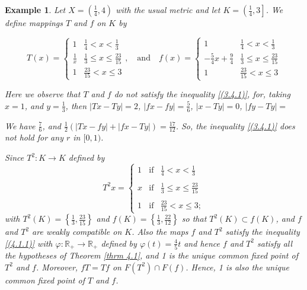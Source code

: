 \documentclass[a4paper,12pt,oneside]{article}
\newtheorem{example}[theorem]{Example}
\numberwithin{equation}{section}
\begin{document}
\begin{example}
    Let \(X = \left(\frac{1}{4}, 4\right)\) with the usual metric and let \(K = \left(\frac{1}{4}, 3\right]\). We define mappings \(T\) and \(f\) on \(K\) by

     \[
    T(x) = \begin{cases} 
        1 & \frac{1}{4} < x < \frac{1}{3} \\
        \frac{1}{x} & \frac{1}{3} \leq x \leq \frac{23}{15} \\
        1 & \frac{23}{15} < x \leq 3 
    \end{cases}, \quad \text{and} \quad
    f(x) = \begin{cases} 
        1 & \frac{1}{4} < x < \frac{1}{3} \\
        -\frac{5}{4}x + \frac{9}{4} & \frac{1}{3} \leq x \leq \frac{23}{15} \\
        1 & \frac{23}{15} < x \leq 3 
    \end{cases}
    \]

Here we observe that \(T\) and \(f\) do not satisfy the inequality \eqref{(3.4.1)}, for, taking \(x = 1\), and \(y = \frac{1}{3}\), then \(|Tx - Ty| = 2\), \(|fx - fy| = \frac{5}{6}\), \(|x - Ty| = 0\), \(|fy - Ty| = \)

We have $\frac{7}{6}$, and $\frac{1}{2}\left(|Tx-fy| + |fx-Ty|\right) = \frac{17}{12}$. So, the inequality \eqref{(3.4.1)} does not hold for any $r$ in $[0,1)$.

Since $T^2:K\to K$ defined by
\[
T^2x = \left\{
\begin{array}{ccc}
1 & \text{if} & \frac{1}{4}<x<\frac{1}{3} \\ 
\\ 
x & \text{if} & \frac{1}{3}\leq x\leq\frac{23}{15} \\ 
\\ 
1 & \text{if} & \frac{23}{15}<x\leq 3;
\end{array}
\right.
\]
with $T^2(K)=\left\{\frac{1}{3},\frac{23}{15}\right\}$ and $f(K)=\left\{\frac{1}{3},\frac{22}{12}\right\}$ so that $T^2(K)\subset f(K)$, and $f$ and $T^2$ are weakly compatible on $K$. Also the maps $f$ and $T^2$ satisfy the inequality \eqref{(4.1.1)} with $\varphi:\mathbb{R}_{+}\to \mathbb{R}_{+}$ defined by $\varphi(t)=\frac{4}{5}t$ and hence $f$ and $T^2$ satisfy all the hypotheses of Theorem \eqref{thrm 4.1}, and 1 is the unique common fixed point of $T^2$ and $f$. Moreover, $fT=Tf$ on $F(T^2)\cap F(f)$. Hence, 1 is also the unique common fixed point of $T$ and $f$.
\end{example}
\end{document}
